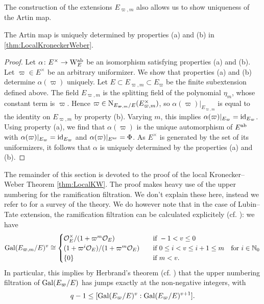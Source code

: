 \documentclass[../main.tex]{subfiles}
\begin{document}
The construction of the extensions $E_{\varpi, m}$ also allows us to show uniqueness 
of the Artin map.

\begin{lem}\label{lem:UniquenessOfArtinMap}
  The Artin map is uniquely determined by properties (a) and (b) in
  \cref{thm:LocalKroneckerWeber}.
\end{lem}
\begin{proof}
  Let $\alpha\colon E^\times \to \mathrm W_E^{\mathrm{ab}}$ be
  an isomorphism satisfying properties (a) and (b). Let $\varpi \in E^\times$
  be an arbitrary
  uniformizer. We show that properties (a) and (b) determine $\alpha(\varpi)$ uniquely.
  Let $E \subset E_{\varpi, m} \subset E_\varpi$ be the finite subextension 
  defined above. The field $E_{\varpi, m}$ is the splitting field of the polynomial
  $\eta_m$, whose constant term is $\varpi$. Hence $\varpi \in
  \mathrm{N}_{E_{\varpi, m}/E}(E_{\varpi, m}^\times)$, so $\alpha(\varpi)|_{E_{\varpi, m}}$ is
  equal to the identity on $E_{\varpi, m}$
  by property (b). Varying $m$, this implies $\alpha(\varpi)|_{E_\varpi} =
  \operatorname{id}_{E_\varpi}$. Using property (a), we find that $\alpha(\varpi)$ is the unique
  automorphism of $E^{\mathrm{ab}}$ with $\alpha(\varpi)|_{E_\varpi} = \operatorname{id}_{E_\varpi}$ and
  $\alpha(\varpi)|_{E^{\mathrm{nr}}} = \Phi$. As $E^\times$ is generated by the set of its
  uniformizers, it follows that $\alpha$ is uniquely determined by the properties (a) and (b).
\end{proof}


The remainder of this section is devoted to the proof of the local Kronecker--Weber 
Theorem \ref{thm:LocalKW}.
The proof makes heavy use of the upper numbering for the ramification filtration.
We don't explain these here, instead we refer to \cite[Chapter
IV]{serre2013local} for a survey of the theory. We
do however note that in the case of Lubin--Tate extension, the 
ramification filtration can be calculated explicitely (cf. \cite[Theorem
2]{gold1981local}): we have
\begin{equation}\label{eq:CalculationOfUpperRamificationFiltration}
  \operatorname{Gal}(E_{\varpi, m}/E)^v \cong \begin{cases}
    \mathcal{O}_E^\times/(1 + \varpi^m \mathcal{O}_E) \quad &\text{if } -1 < v \leq 0 \\
    (1 + \varpi^i \mathcal{O}_E)/(1+\varpi^m \mathcal{O}_E) \quad &\text{if } 0 \leq i < v \leq i+1
    \leq m 
    \quad \text{for } i \in \mathbb{N}_0 \\
    \{0\} \quad &\text{if } m < v.
  \end{cases}
\end{equation}
In particular, this implies by Herbrand's theorem (cf. \cite[Ch. 4, Proposition
-14]{serre2013local}) that the upper numbering filtration of 
$\operatorname{Gal}(E_\varpi/E)$ has jumps exactly at the non-negative integers, with
\begin{equation*}
  q-1 \leq [\operatorname{Gal}(E_\varpi/E)^{v} : \operatorname{Gal}(E_\varpi/E)^{v+1}].
\end{equation*}
\end{document}
